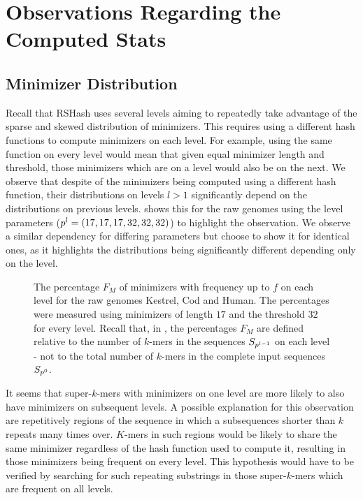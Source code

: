 \documentclass[a4paper,titlepage,onecolumn,oneside,12pt,nenglish,titlepage=firstiscover]{scrbook}
\theoremstyle{plain} %
\theoremstyle{definition} %
\theoremstyle{remark} %
\theoremstyle{plain}
\newcommand{\level}{l}
\begin{document}
\section{Observations Regarding the Computed Stats} \label{sec:observations}
\subsection{Minimizer Distribution}
Recall that RSHash uses several levels aiming to repeatedly take advantage of the sparse and skewed distribution of minimizers. This requires using a different hash functions to compute minimizers on each level. For example, using the same function on every level would mean that given equal minimizer length and threshold, those minimizers which are \frequent on a level would also be \frequent on the next.
We observe that despite of the minimizers being computed using a different hash function, their distributions on levels $\level > 1$ significantly depend on the distributions on previous levels.  shows this for the raw genomes using the level parameters ($\levelParameters{\level} = (17,17,17,32,32,32)$) to highlight the observation. We observe a similar dependency for differing parameters but choose to show it for identical ones, as it highlights the distributions being significantly different depending only on the level.\\
\begin{figure}[h]
	\centering
	
	\caption{The percentage $F_M$ of minimizers with frequency up to $f$ on each level for the raw genomes Kestrel, Cod and Human. The percentages were measured using minimizers of length $17$ and the threshold $32$ for every level. Recall that, in , the percentages $F_M$ are defined relative to the number of $k$-mers in the sequences $\sequences{\level-1}$ on each level - not to the total number of $k$-mers in the complete input sequences $S_{p^{0}}$.} \label{fig:multilevelDistribution}
\end{figure}

It seems that super-$k$-mers with \frequent minimizers on one level are more likely to also have \frequent minimizers on subsequent levels.
A possible explanation for this observation are repetitively regions of the sequence in which a subsequences shorter than $k$ repeats many times over. $K$-mers in such regions would be likely to share the same minimizer regardless of the hash function used to compute it, resulting in those minimizers being frequent on every level. This hypothesis would have to be verified by searching for such repeating substrings in those super-$k$-mers which are frequent on all levels.\\
\end{document}
